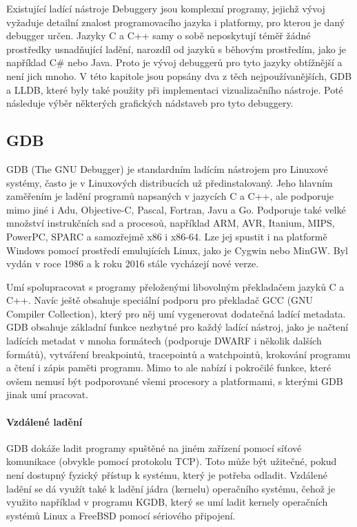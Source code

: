 \documentclass[czech,bachelor,male,python,dept460,hidelinks]{diploma}						%
\newcommand{\parspace}[1][]{
	\ifthenelse{\isempty{#1}}{\vspace{5mm}}{\vspace{#1}}
	\par
}
\begin{document}
\begin{section}{Existující ladící nástroje}
\label{sec:ExistingDebuggers}
	Debuggery jsou komplexní programy, jejichž vývoj vyžaduje detailní znalost programovacího jazyka i platformy, pro kterou je daný debugger určen.
	Jazyky C a C++ samy o sobě neposkytují téměř žádné prostředky usnadňující ladění, narozdíl od jazyků s běhovým prostředím, jako je například C\# nebo Java.
	Proto je vývoj debuggerů pro tyto jazyky obtížnější a není jich mnoho. V této kapitole jsou popsány dva z těch nejpoužívanějších,
	GDB a LLDB, které byly také použity při implementaci vizualizačního nástroje. Poté následuje výběr některých grafických nádstaveb pro tyto debuggery.

	\subsection{GDB}
		GDB (The GNU Debugger) je standardním ladícím nástrojem pro Linuxové systémy, často je v Linuxových distribucích už předinstalovaný.
		Jeho hlavním zaměřením je ladění programů napsaných v jazycích C a C++, ale podporuje mimo jiné i Adu, Objective-C, Pascal, Fortran, Javu
		a Go. \cite{gdb-languages} Podporuje také velké množství instrukčních sad a procesoů, například ARM, AVR, Itanium, MIPS, PowerPC, SPARC a
		samozřejmě x86 i x86-64. Lze jej spustit i na platformě Windows pomocí prostředí emulujících Linux, jako je Cygwin nebo MinGW.
		Byl vydán v roce 1986 a k roku 2016 stále vycházejí nové verze.
		
		\parspace Umí spolupracovat s programy přeloženými libovolným překladačem jazyků C a C++. Navíc ještě obsahuje
		speciální podporu pro překladač GCC (GNU Compiler Collection), který pro něj umí vygenerovat dodatečná ladící metadata.
		GDB obsahuje základní funkce nezbytné pro každý ladící nástroj, jako je načtení ladících metadat v mnoha formátech (podporuje DWARF i několik dalších
		formátů), vytváření breakpointů, tracepointů a watchpointů, krokování programu a čtení i zápis paměti programu.
		Mimo to ale nabízí i pokročilé funkce, které ovšem nemusí být podporované všemi procesory a platformami, s kterými GDB jinak umí pracovat.
		
		\paragraph*{Vzdálené ladění}
			GDB dokáže ladit programy spuštěné na jiném zařízení pomocí síťové komunikace (obvykle pomocí protokolu TCP).
			Toto může být užitečné, pokud není dostupný fyzický přístup k systému, který je potřeba odladit.
			Vzdálené ladění se dá využít také k ladění jádra (kernelu) operačního systému, čehož je využito například v programu KGDB, který se umí ladit
			kernely operačních systémů Linux a FreeBSD pomocí sériového připojení.

\end{section}
\end{document}
